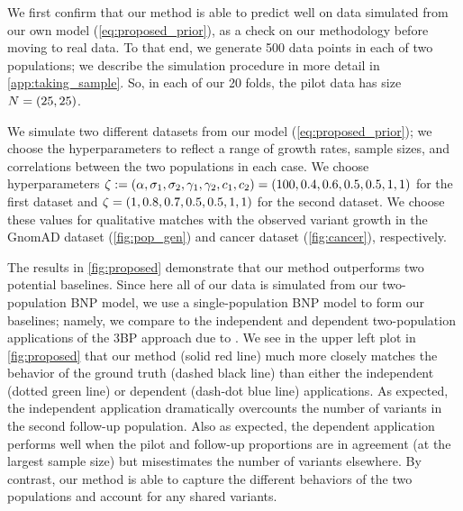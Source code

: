 
We first confirm that our method is able to predict well on data simulated from our own model (\cref{eq:proposed_prior}), as a check on our methodology before moving to real data. To that end, we generate 500 data points in each of two populations; we describe the simulation procedure in more detail in \cref{app:taking_sample}. So, in each of our 20 folds, the pilot data has size $\vecsamplesize = (25,25)$.

We simulate two different datasets from our model (\cref{eq:proposed_prior}); we choose the hyperparameters to reflect a range of growth rates, sample sizes, and correlations between the two populations in each case. We choose hyperparameters $\allhyper := (\mass, \rate{1},\rate{2}, \corr{1},\corr{2}, \conc{1},\conc{2}) = (100,0.4,0.6,0.5,0.5,1,1)$ for the first dataset and $\allhyper = (1,0.8,0.7,0.5,0.5,1,1)$ for the second dataset. We choose these values for qualitative matches with the observed variant growth in the GnomAD dataset (\cref{fig:pop_gen}) and cancer dataset (\cref{fig:cancer}), respectively. 

The results in \cref{fig:proposed} demonstrate that our method outperforms two potential baselines. Since here all of our data is simulated from our two-population BNP model, we use a single-population BNP model to form our baselines; namely, we compare to the independent and dependent two-population applications of the 3BP approach due to \citet{Masoero2022}.  We see in the upper left plot in \cref{fig:proposed} that our method (solid red line) much more closely matches the behavior of the ground truth (dashed black line) than either the independent (dotted green line) or dependent (dash-dot blue line) applications. As expected, the independent application dramatically overcounts the number of variants in the second follow-up population. Also as expected, the dependent application performs well when the pilot and follow-up proportions are in agreement (at the largest sample size) but misestimates the number of variants elsewhere. By contrast, our method is able to capture the different behaviors of the two populations and account for any shared variants.

